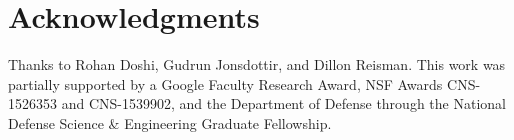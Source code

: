 \section*{Acknowledgments}
Thanks to Rohan Doshi, Gudrun Jonsdottir, and Dillon Reisman. This work was partially supported by a Google Faculty Research Award, NSF Awards CNS-1526353 and CNS-1539902, and the Department of Defense through the National Defense Science \& Engineering Graduate Fellowship. 

